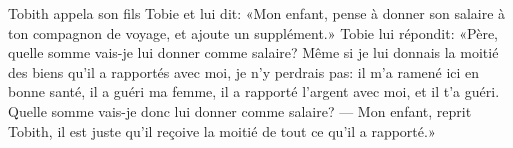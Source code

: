 Tobith appela son fils Tobie et lui dit:
	«Mon enfant, pense à donner son salaire à ton compagnon de voyage,
	et ajoute un supplément.»
Tobie lui répondit:
	«Père, quelle somme vais-je lui donner comme salaire?
	Même si je lui donnais la moitié des biens qu’il a rapportés avec moi,
	je n’y perdrais pas:
	il m’a ramené ici en bonne santé, il a guéri ma femme,
	il a rapporté l’argent avec moi, et il t’a guéri.
Quelle somme vais-je donc lui donner comme salaire?
--- Mon enfant, reprit Tobith,
	il est juste qu’il reçoive la moitié de tout ce qu’il a rapporté.»
